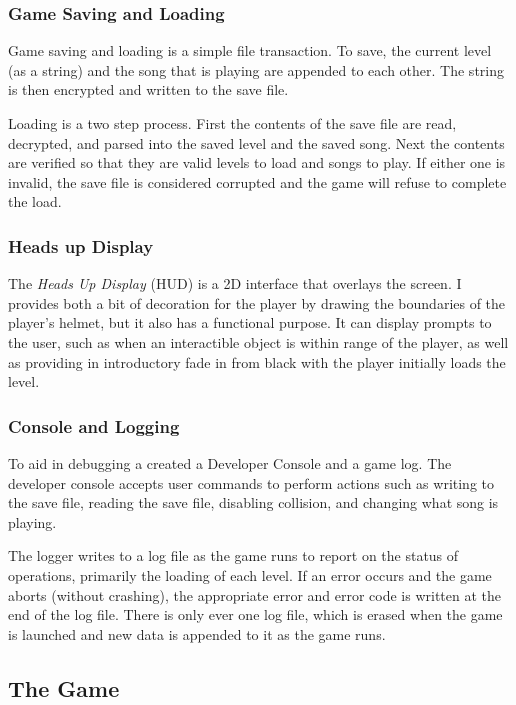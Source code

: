 \documentclass{article}
\begin{document}
\subsubsection{Game Saving and Loading} \label{subsubsec:saveload}

Game saving and loading is a simple file transaction. To save, the current level (as a string) and the song that is playing are appended to each other. The string is then encrypted and written to the save file.

Loading is a two step process. First the contents of the save file are read, decrypted, and parsed into the saved level and the saved song. Next the contents are verified so that they are valid levels to load and songs to play. If either one is invalid, the save file is considered corrupted and the game will refuse to complete the load.

\subsubsection{Heads up Display} \label{subsubsec:HUD}

The \emph{Heads Up Display} (HUD) is a 2D interface that overlays the screen. I provides both a bit of decoration for the player by drawing the boundaries of the player's helmet, but it also has a functional purpose. It can display prompts to the user, such as when an interactible object is within range of the player, as well as providing in introductory fade in from black with the player initially loads the level.

\subsubsection{Console and Logging} \label{subsubsec:console}

To aid in debugging a created a Developer Console and a game log. The developer console accepts user commands to perform actions such as writing to the save file, reading the save file, disabling collision, and changing what song is playing.

The logger writes to a log file as the game runs to report on the status of operations, primarily the loading of each level. If an error occurs and the game aborts (without crashing), the appropriate error and error code is written at the end of the log file. There is only ever one log file, which is erased when the game is launched and new data is appended to it as the game runs.

\subsection{The Game} \label{subsec:thegame}
\end{document}
